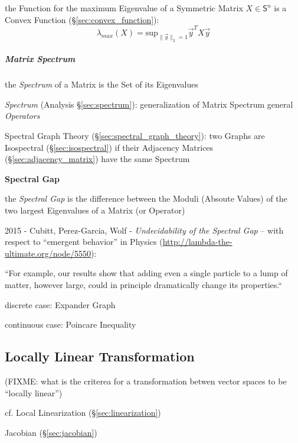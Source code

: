 the Function for the maximum Eigenvalue of a Symmetric Matrix $X \in
\mathsf{S}^n$ is a Convex Function (\S\ref{sec:convex_function}):
\[
  \lambda_{max}(X) = \mathrm{sup}_{\|\vec{y}\|_2=1} \vec{y}^T X \vec{y}
\]



\subparagraph{Matrix Spectrum}\label{sec:matrix_spectrum}\hfill

the \emph{Spectrum} of a Matrix is the Set of its Eigenvalues

\fist \emph{Spectrum} (Analysis \S\ref{sec:spectrum}): generalization of Matrix
Spectrum general \emph{Operators}

\fist Spectral Graph Theory (\S\ref{sec:spectral_graph_theory}): two Graphs are
Isospectral (\S\ref{sec:isospectral}) if their Adjacency Matrices
(\S\ref{sec:adjacency_matrix}) have the same Spectrum


\textbf{Spectral Gap}

the \emph{Spectral Gap} is the difference between the Moduli (Absoute Values) of
the two largest Eigenvalues of a Matrix (or Operator)

2015 - Cubitt, Perez-Garcia, Wolf - \emph{Undecidability of the Spectral Gap} --
with respect to ``emergent behavior'' in Physics
(\url{http://lambda-the-ultimate.org/node/5550}):

``For example, our results show that adding even a single particle to a lump of
matter, however large, could in principle dramatically change its properties.``

discrete case: Expander Graph

continuous case: Poincare Inequality



\subsection{Locally Linear Transformation}\label{sec:locally_linear}


(FIXME: what is the criterea for a transformation betwen vector spaces to be
``locally linear'')

\fist cf. Local Linearization (\S\ref{sec:linearization})

\fist Jacobian (\S\ref{sec:jacobian})



